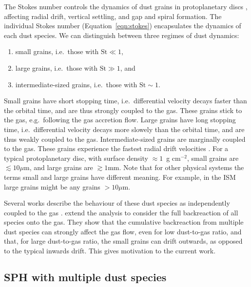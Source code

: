 \documentclass[fleqn,usenatbib]{mnras}
\begin{document}
The Stokes number controls the dynamics of dust grains in protoplanetary discs
\citep{Weidenschilling1977MNRAS.180...57W,Takeuchi2002ApJ...581.1344T},
affecting radial drift, vertical settling, and gap and spiral formation. The
individual Stokes number (Equation~\ref{eqn:stokes}) encapsulates the dynamics
of each dust species. We can distinguish between three regimes of dust dynamics:
%
\begin{enumerate}
   \item small grains, i.e.\ those with \(\mathrm{St} \ll 1\),
   \item large grains, i.e.\ those with \(\mathrm{St} \gg 1\), and
   \item intermediate-sized grains, i.e.\ those with \(\mathrm{St} \sim 1\).
\end{enumerate}
%
Small grains have short stopping time, i.e.\ differential velocity decays faster
than the orbital time, and are thus strongly coupled to the gas. These grains
stick to the gas, e.g.\ following the gas accretion flow. Large grains have long
stopping time, i.e.\ differential velocity decays more slowely than the orbital
time, and are thus weakly coupled to the gas. Intermediate-sized grains are
marginally coupled to the gas. These grains experience the fastest radial drift
velocities \citep{Takeuchi2002ApJ...581.1344T,Ayliffe2012MNRAS.423.1450A}. For a
typical protoplanetary disc, with surface density \(\approx 1\)~g cm\({}^{-2}\),
small grains are \(\lesssim 10 \mu\mathrm{m}\), and large grains are \(\gtrsim 1
\mathrm{mm}\). Note that for other physical systems the terms small and large
grains have different meaning. For example, in the ISM large grains might be any
grains \(> 10 \mu\mathrm{m}\).

Several works describe the behaviour of these dust species as independently
coupled to the gas \citep{Nakagawa1986Icar...67..375N,
Dipierro2017MNRAS.469.1932D, Kanagawa2017ApJ...844..142K}.
\citet{Dipierro2018MNRAS.479.4187D} extend the analysis to consider the full
backreaction of all species onto the gas. They show that the cumulative
backreaction from multiple dust species can strongly affect the gas flow, even
for low dust-to-gas ratio, and that, for large dust-to-gas ratio, the small
grains can drift outwards, as opposed to the typical inwards drift. This gives
motivation to the current work.


\subsection{SPH with multiple dust species}%
\label{subsec:sph}
\end{document}
